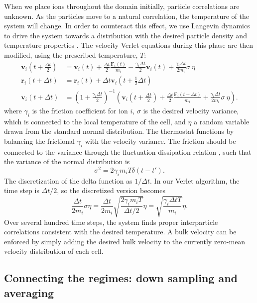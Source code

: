 \documentclass{article}
\begin{document}
When we place ions throughout the domain initially, particle correlations are unknown. As the particles move to a natural correlation, the temperature of the system will change. In order to counteract this effect, we use Langevin dynamics to drive the system towards a distribution with the desired particle density and temperature properties \cite{hunenberger2005thermostat}. The velocity Verlet equations during this phase are then modified, using the prescribed temperature, $T$:
\begin{align*}
\mathbf{v}_i\left(t+\frac{\Delta t}{2}\right) &= \mathbf{v}_i(t) + \frac{\Delta t}{2}\frac{\mathbf{F}_i(t)}{m_i} - \frac{\gamma_i\Delta t}{2}\mathbf{v}_i(t) + \frac{\gamma_i\Delta t}{2m_i}\sigma\:\eta \\
\mathbf{r}_i(t+\Delta t) &= \mathbf{r}_i(t) + \Delta t\mathbf{v}_i\left(t+\frac{1}{2}\Delta t\right) \\
\mathbf{v}_i(t+\Delta t) &= \left(1 + \frac{\gamma_i\Delta t}{2}\right)^{-1} \left(\mathbf{v}_i\left(t+\frac{\Delta t}{2}\right) +  \frac{\Delta t}{2}\frac{\mathbf{F}_i(t+\Delta t)}{m_i} + \frac{\gamma_i \Delta t}{2m_i}\sigma\:\eta\right).
\end{align*}
where $\gamma_i$ is the friction coefficient for ion $i$, $\sigma$ is the desired velocity variance, which is connected to the local temperature of the cell, and $\eta$ a random variable drawn from the standard normal distribution. The thermostat functions by balancing the frictional $\gamma_i$ with the velocity variance. The friction should be connected to the variance through the fluctuation-dissipation relation \cite{kubo1966fluctuation}, such that the variance of the normal distribution is
\[\sigma^2=2\gamma_im_iT\delta(t-t').
\]The discretization of the delta function as $1/\Delta t$. In our Verlet algorithm, the time step is $\Delta t/2$, so the discretized version becomes
\[\frac{\Delta t}{2m_i}\sigma\eta=\frac{\Delta t}{2m_i}\sqrt{\frac{2\gamma_im_iT}{\Delta t/2}}\eta=\sqrt{\frac{\gamma_i \Delta tT}{m_i}}\eta.
\]Over several hundred time steps, the system finds proper interparticle correlations consistent with the desired temperature. A bulk velocity can be enforced by simply adding the desired bulk velocity to the currently zero-mean velocity distribution of each cell.

\subsection{Connecting the regimes: down sampling and averaging}
\end{document}
